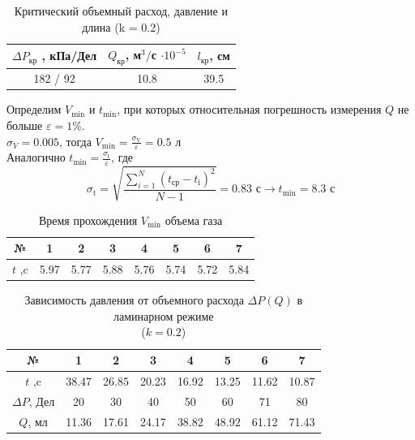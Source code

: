 \begin{table}[h!]
    \centering
    \begin{tabular}{|c|c|c|}
        \hline
        $\Delta P_{\text{кр}}$ , кПа/Дел& $Q_{\text{кр}}$, м$^3/$с $\cdot 10^{-5}$ & $l_{\text{кр}}$, см \\\hline
        182 / 92 & 10.8 & 39.5\\\hline
    \end{tabular}
    \caption{Критический объемный расход, давление и длина (k = 0.2)}
\end{table}

Определим $V_{\text{min}}$ и $t_{\text{min}}$, при которых относительная
погрешность измерения $Q$ не больше $\varepsilon = 1\%$.\\
$\sigma_{V} = 0.005$, тогда $V_{\text{min}} = \frac{\sigma_{\text{V}}}{\varepsilon} = 0.5$ л\\ 
Аналогично $t_{\text{min}} = \frac{\sigma_{\text{t}}}{\varepsilon}$, где
$$\sigma_{\text{t}} = \sqrt{\frac{\sum_{i=1}^{N} (t_{\text{ср}} - t_{\text{i}})^2}{N-1}} = 0.83\text{ с} \rightarrow t_{\text{min}} = 8.3\text{ с}$$
\begin{table}[h!]
    \centering
    \begin{tabular}{|c|c|c|c|c|c|c|c|}
        \hline
        №  & 1 & 2 & 3 & 4 & 5 & 6 & 7\\\hline 
        $t$ ,c& 5.97 & 5.77 & 5.88 & 5.76 & 5.74 & 5.72 & 5.84 \\\hline
    \end{tabular}
    \caption{Время прохождения $V_{\text{min}}$ объема газа}
\end{table}

\begin{table}[h!]
    \centering
    \begin{tabular}{|c|c|c|c|c|c|c|c|}
        \hline
        №  & 1 & 2 & 3 & 4 & 5 & 6 & 7\\\hline 
        $t$ ,c& 38.47 & 26.85 & 20.23 & 16.92 & 13.25 & 11.62 & 10.87 \\\hline
        $\Delta P$, Дел & 20 & 30 & 40 & 50 & 60 & 71 & 80\\\hline 
        $Q$, мл & 11.36 & 17.61 & 24.17 & 38.82 & 48.92 & 61.12 & 71.43\\\hline 
    \end{tabular}
    \caption{Зависимость давления от объемного расхода $\Delta P(Q)$ 
    в ламинарном режиме\\ ($k = 0.2$)}
\end{table}

